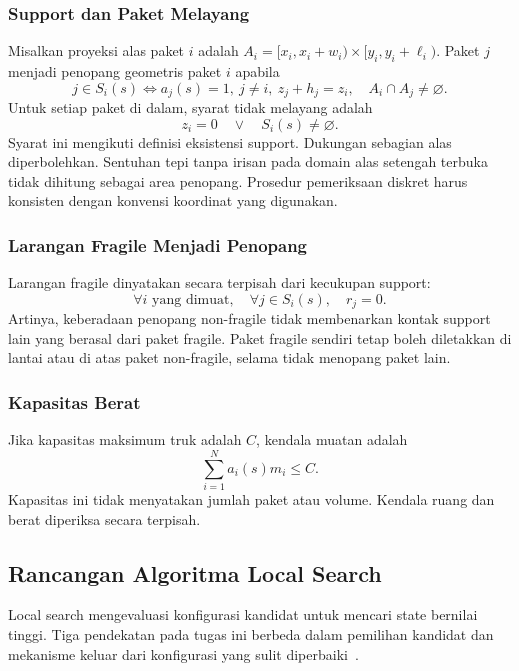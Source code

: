 \subsubsection{Support dan Paket Melayang}
Misalkan proyeksi alas paket $i$ adalah
$A_i=[x_i,x_i+w_i)\times[y_i,y_i+\ell_i)$.
Paket $j$ menjadi penopang geometris paket $i$ apabila
\begin{equation}
 j\in S_i(s)\iff a_j(s)=1,\ j\ne i,\ z_j+h_j=z_i,
 \quad A_i\cap A_j\ne\varnothing.
\end{equation}
Untuk setiap paket di dalam, syarat tidak melayang adalah
\begin{equation}
 z_i=0\quad\lor\quad S_i(s)\ne\varnothing.\label{eq:support}
\end{equation}
Syarat ini mengikuti definisi eksistensi support. Dukungan sebagian alas
diperbolehkan. Sentuhan tepi tanpa irisan pada domain alas setengah terbuka
tidak dihitung sebagai area penopang. Prosedur pemeriksaan diskret harus
konsisten dengan konvensi koordinat yang digunakan.

\subsubsection{Larangan Fragile Menjadi Penopang}
Larangan fragile dinyatakan secara terpisah dari kecukupan support:
\begin{equation}
 \forall i\text{ yang dimuat},\quad \forall j\in S_i(s),\quad r_j=0.
\end{equation}
Artinya, keberadaan penopang non-fragile tidak membenarkan kontak support lain
yang berasal dari paket fragile. Paket fragile sendiri tetap boleh diletakkan
di lantai atau di atas paket non-fragile, selama tidak menopang paket lain.

\subsubsection{Kapasitas Berat}
Jika kapasitas maksimum truk adalah $C$, kendala muatan adalah
\begin{equation}
 \sum_{i=1}^{N}a_i(s)m_i\leq C.\label{eq:berat}
\end{equation}
Kapasitas ini tidak menyatakan jumlah paket atau volume. Kendala ruang dan
berat diperiksa secara terpisah.


\subsection{Rancangan Algoritma Local Search}
Local search mengevaluasi konfigurasi kandidat untuk mencari state bernilai
tinggi. Tiga pendekatan pada tugas ini berbeda dalam pemilihan kandidat dan
mekanisme keluar dari konfigurasi yang sulit diperbaiki~\cite{kuliah}.

